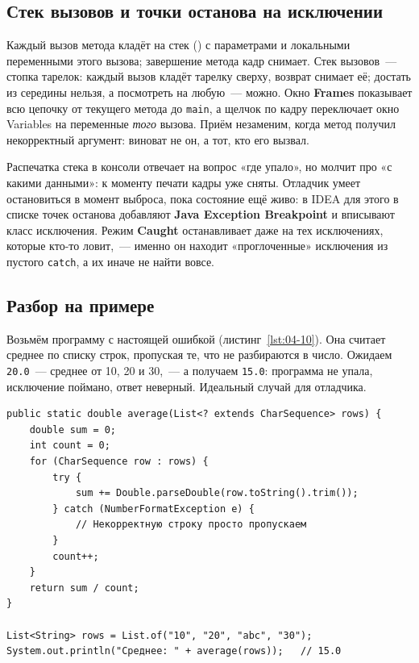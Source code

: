 \subsection{Стек вызовов и точки останова на исключении}

Каждый вызов метода кладёт на стек  () с параметрами и
локальными переменными этого вызова; завершение метода кадр снимает. Стек
вызовов~--- стопка тарелок: каждый вызов кладёт тарелку сверху, возврат снимает
её; достать из середины нельзя, а посмотреть на любую~--- можно. Окно
\textbf{Frames} показывает всю цепочку от текущего метода до \texttt{main}, а
щелчок по кадру переключает окно Variables на переменные \emph{того} вызова.
Приём незаменим, когда метод получил некорректный аргумент: виноват не он, а
тот, кто его вызвал.

Распечатка стека в консоли отвечает на вопрос «где упало», но молчит про «с
какими данными»: к моменту печати кадры уже сняты. Отладчик умеет остановиться
в момент выброса, пока состояние ещё живо: в IDEA для этого в списке точек
останова добавляют \textbf{Java Exception Breakpoint} и вписывают класс
исключения. Режим \textbf{Caught} останавливает даже на тех исключениях,
которые кто-то ловит,~--- именно он находит «проглоченные» исключения из
пустого \texttt{catch}, а их иначе не найти вовсе.

\subsection{Разбор на примере}

Возьмём программу с настоящей ошибкой (листинг~\ref{lst:04-10}). Она считает
среднее по списку строк, пропуская те, что не разбираются в число. Ожидаем
\texttt{20.0}~--- среднее от 10, 20 и 30,~--- а получаем \texttt{15.0}:
программа не упала, исключение поймано, ответ неверный. Идеальный случай для
отладчика.

\begin{listing}[H]
\begin{verbatim}
public static double average(List<? extends CharSequence> rows) {
    double sum = 0;
    int count = 0;
    for (CharSequence row : rows) {
        try {
            sum += Double.parseDouble(row.toString().trim());
        } catch (NumberFormatException e) {
            // Некорректную строку просто пропускаем
        }
        count++;
    }
    return sum / count;
}

List<String> rows = List.of("10", "20", "abc", "30");
System.out.println("Среднее: " + average(rows));   // 15.0
\end{verbatim}
\caption{Программа, которая считает неправильно}
\label{lst:04-10}
\end{listing}

